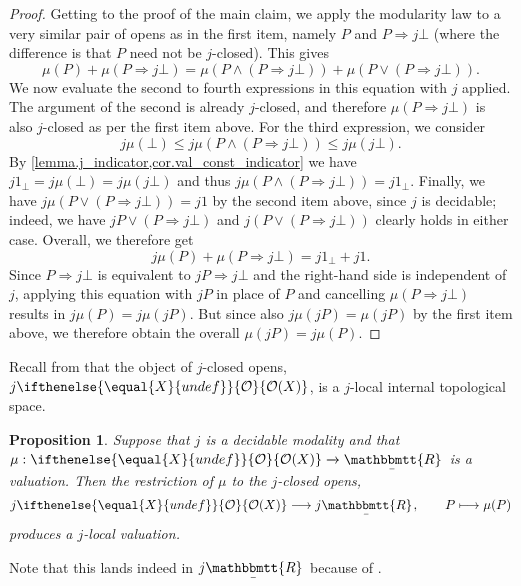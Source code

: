 \documentclass[reqno,11pt]{amsproc}
\theoremstyle{plain}
\newtheorem{proposition}[theorem]{Proposition}
\theoremstyle{definition}
\renewcommand{\to}[1][]{\xrightarrow{#1}}
\newcommand{\ubar}[1]{\underaccent{\bar}{#1}}
\newcommand{\ind}[1]{1_{#1}}			%
\newcommand{\internal}[1]{\raisebox{-.03ex}{$\mathbbmtt{#1}$}}
\newcommand{\hs}{\hspace{1pt}}
\newcommand{\trr}{\internal{R}}
\newcommand{\tlrr}{\ubar{\trr}\hs}
\newcommand{\Op}[1][undef]{\ifthenelse{\equal{#1}{undef}}{\mathcal{O}}{\mathcal{O}(#1)}}
\newcommand{\imp}{\Rightarrow}
\numberwithin{equation}{section}
\begin{document}
\begin{proof}
	Getting to the proof of the main claim, we apply the modularity law to a very similar pair of opens as in the first item, namely $P$ and $P \Rightarrow j\bot$ (where the difference is that $P$ need not be $j$-closed). This gives
	\[
		\mu(P) + \mu(P \Rightarrow j\bot) = \mu(P \land (P \Rightarrow j\bot)) + \mu(P \lor (P \Rightarrow j\bot)).
	\]
	We now evaluate the second to fourth expressions in this equation with $j$ applied. The argument of the second is already $j$-closed, and therefore $\mu(P \Rightarrow j\bot)$ is also $j$-closed as per the first item above. For the third expression, we consider
	\[
		j \mu(\bot) \le j \mu(P \land (P \Rightarrow j\bot)) \le j \mu(j\bot).
	\]
	By \cref{lemma.j_indicator,cor.val_const_indicator} we have $j \ind{\bot}=j \mu(\bot)=j\mu(j\bot)$ and thus $j \mu(P \land (P \Rightarrow j\bot)) =  j \ind{\bot}$. Finally, we have $j \mu(P \lor (P \Rightarrow j\bot)) = j 1$ by the second item above, since $j$ is decidable; indeed, we have $jP\vee(P\imp j\bot)$ and $j(P \lor (P \Rightarrow j\bot))$ clearly holds in either case. Overall, we therefore get
	\[
		j \mu(P) + \mu(P \Rightarrow j\bot) = j \ind{\bot} + j 1.
	\]
	Since $P \Rightarrow j\bot$ is equivalent to $jP \Rightarrow j\bot$ and the right-hand side is independent of $j$, applying this equation with $jP$ in place of $P$ and cancelling $\mu(P \Rightarrow j\bot)$ results in $j \mu(P) = j \mu(jP)$. But since also $j \mu(jP) = \mu(jP)$ by the first item above, we therefore obtain the overall $\mu(jP) = j \mu(P)$.
\end{proof}

Recall from  that the object of $j$-closed opens, $j \Op[X]$, is a $j$-local internal topological space.

\begin{proposition}
	\label{val_localize}
	Suppose that $j$ is a decidable modality and that $\mu : \Op[X] \to \tlrr$ is a valuation. Then the restriction of $\mu$ to the $j$-closed opens,
	\[
		j \Op[X] \longrightarrow j \tlrr, \qquad P \longmapsto \mu(P)
	\]
	produces a $j$-local valuation.
\end{proposition}

Note that this lands indeed in $j \tlrr$ because of .
\end{document}
